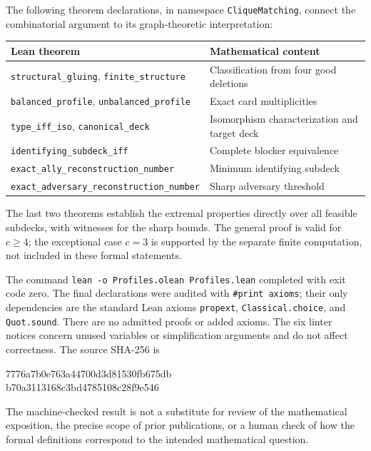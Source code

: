 \documentclass[11pt]{article}
\begin{document}
The following theorem declarations, in namespace \texttt{CliqueMatching}, connect the combinatorial argument to its graph-theoretic interpretation:
\begin{center}
\begin{tabular}{@{}p{.46\linewidth}p{.48\linewidth}@{}}
\toprule
Lean theorem & Mathematical content \\
\midrule
\texttt{structural\_gluing}, \texttt{finite\_structure} & Classification from four good deletions \\
\texttt{balanced\_profile}, \texttt{unbalanced\_profile} & Exact card multiplicities \\
\texttt{type\_iff\_iso}, \texttt{canonical\_deck} & Isomorphism characterization and target deck \\
\texttt{identifying\_subdeck\_iff} & Complete blocker equivalence \\
\texttt{exact\_ally\_reconstruction\_number} & Minimum identifying subdeck \\
\texttt{exact\_adversary\_reconstruction\_number} & Sharp adversary threshold \\
\bottomrule
\end{tabular}
\end{center}
The last two theorems establish the extremal properties directly over all feasible subdecks, with witnesses for the sharp bounds. The general proof is valid for $c\geq4$; the exceptional case $c=3$ is supported by the separate finite computation, not included in these formal statements.

The command \texttt{lean -o Profiles.olean Profiles.lean} completed with exit code zero. The final declarations were audited with \texttt{\#print axioms}; their only dependencies are the standard Lean axioms \texttt{propext}, \texttt{Classical.choice}, and \texttt{Quot.sound}. There are no admitted proofs or added axioms. The six linter notices concern unused variables or simplification arguments and do not affect correctness. The source SHA-256 is
\begin{center}\small\ttfamily
7776a7b0e763a44700d3d81530fb675db\\
b70a3113168c3bd4785108c28f9e546
\end{center}
The machine-checked result is not a substitute for review of the mathematical exposition, the precise scope of prior publications, or a human check of how the formal definitions correspond to the intended mathematical question.
\end{document}
